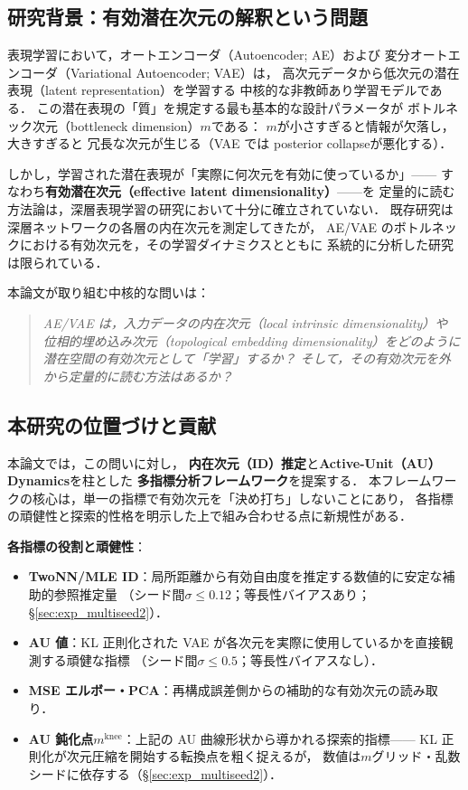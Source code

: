 \documentclass[11pt,a4paper]{jsarticle}
\newcommand{\mknee}{m^{\mathrm{knee}}}
\begin{document}
\subsection{研究背景：有効潜在次元の解釈という問題}\label{sec:intro_bg}

表現学習において，オートエンコーダ（Autoencoder; AE）および
変分オートエンコーダ（Variational Autoencoder; VAE）\cite{kingma2014vae}は，
高次元データから低次元の潜在表現（latent representation）を学習する
中核的な非教師あり学習モデルである\cite{bengio2013representation}．
この潜在表現の「質」を規定する最も基本的な設計パラメータが
ボトルネック次元（bottleneck dimension）$m$である：
$m$が小さすぎると情報が欠落し，大きすぎると
冗長な次元が生じる（VAE では posterior collapse\cite{lucas2019elbo}が悪化する）．

しかし，学習された潜在表現が「実際に何次元を有効に使っているか」——
すなわち\textbf{有効潜在次元（effective latent dimensionality）}——を
定量的に読む方法論は，深層表現学習の研究において十分に確立されていない．
既存研究\cite{ansuini2019intrinsic,valeriani2023geometry}は
深層ネットワークの各層の内在次元を測定してきたが，
AE/VAE のボトルネックにおける有効次元を，その学習ダイナミクスとともに
系統的に分析した研究は限られている．

本論文が取り組む中核的な問いは：
\begin{quote}
\textit{AE/VAE は，入力データの内在次元（local intrinsic dimensionality）や
位相的埋め込み次元（topological embedding dimensionality）をどのように
潜在空間の有効次元として「学習」するか？
そして，その有効次元を外から定量的に読む方法はあるか？}
\end{quote}

\subsection{本研究の位置づけと貢献}\label{sec:intro_aim}

本論文では，この問いに対し，
\textbf{内在次元（ID）推定}と\textbf{Active-Unit（AU）Dynamics}を柱とした
\textbf{多指標分析フレームワーク}を提案する．
本フレームワークの核心は，単一の指標で有効次元を「決め打ち」しないことにあり，
各指標の頑健性と探索的性格を明示した上で組み合わせる点に新規性がある．

\textbf{各指標の役割と頑健性}：
\begin{itemize}
  \item \textbf{TwoNN/MLE ID}：局所距離から有効自由度を推定する数値的に安定な補助的参照推定量
        （シード間$\sigma \leq 0.12$；等長性バイアスあり；§\ref{sec:exp_multiseed2}）．
  \item \textbf{AU 値}：KL 正則化された VAE が各次元を実際に使用しているかを直接観測する頑健な指標
        （シード間$\sigma \leq 0.5$；等長性バイアスなし）．
  \item \textbf{MSE エルボー・PCA}：再構成誤差側からの補助的な有効次元の読み取り．
  \item \textbf{AU 鈍化点$\mknee$}：上記の AU 曲線形状から導かれる探索的指標——
        KL 正則化が次元圧縮を開始する転換点を粗く捉えるが，
        数値は$m$グリッド・乱数シードに依存する（§\ref{sec:exp_multiseed2}）．
\end{itemize}
\end{document}

